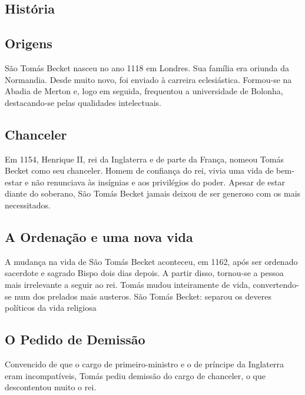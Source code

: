 \documentclass[15pt]{article}
\begin{document}
\begin{justify}

\begin{center}
 \section{História}
\end{center}

\subsection{Origens}\label{sub:Origens} %

São Tomás Becket nasceu no ano 1118 em Londres. Sua família era oriunda da Normandia. Desde muito novo, foi enviado à carreira eclesiástica. Formou-se na Abadia de Merton e, logo em seguida, frequentou a universidade de Bolonha, destacando-se pelas qualidades intelectuais.

\subsection{Chanceler}\label{sub:} %

Em 1154, Henrique II, rei da Inglaterra e de parte da França, nomeou Tomás Becket como seu chanceler. Homem de confiança do rei, vivia uma vida de bem-estar e não renunciava às insígnias e aos privilégios do poder. Apesar de estar diante do soberano, São Tomás Becket jamais deixou de ser generoso com os mais necessitados.

\subsection{A Ordenação e uma nova vida}\label{sub:} %

A mudança na vida de São Tomás Becket aconteceu, em 1162, após ser ordenado sacerdote e sagrado Bispo dois dias depois. A partir disso, tornou-se a pessoa mais irrelevante a seguir ao rei. Tomás mudou inteiramente de vida, convertendo-se num dos prelados mais austeros.
São Tomás Becket: separou os deveres políticos da vida religiosa 

\subsection{O Pedido de Demissão}\label{sub:} %

Convencido de que o cargo de primeiro-ministro e o de príncipe da Inglaterra eram incompatíveis, Tomás pediu demissão do cargo de chanceler, o que descontentou muito o rei. 


\end{justify}
\end{document}
